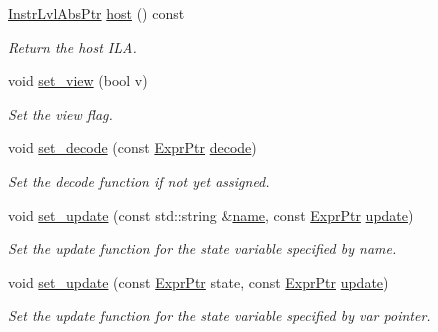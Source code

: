 \begin{DoxyCompactItemize}
\mbox{\label{classilang_1_1_instr_a302d102dcc5e8c47f97f37391d656179}} 
\mbox{\hyperlink{classilang_1_1_instr_ab36b0ed04e0c44e66867ed1d61009f12}{Instr\+Lvl\+Abs\+Ptr}} \mbox{\hyperlink{classilang_1_1_instr_a302d102dcc5e8c47f97f37391d656179}{host}} () const
\begin{DoxyCompactList}\small\item\em Return the host I\+LA. \end{DoxyCompactList}\item 
void \mbox{\hyperlink{classilang_1_1_instr_a797d88453c8368611a2ed36c8edf99a2}{set\+\_\+view}} (bool v)
\begin{DoxyCompactList}\small\item\em Set the view flag. \end{DoxyCompactList}\item 
void \mbox{\hyperlink{classilang_1_1_instr_aab1827c6605186d0f2a71635dea19285}{set\+\_\+decode}} (const \mbox{\hyperlink{namespaceilang_a7c4196c72e53ea4df4b7861af7bc3bce}{Expr\+Ptr}} \mbox{\hyperlink{classilang_1_1_instr_a85ca826871a1ed004189ef24e994cfea}{decode}})
\begin{DoxyCompactList}\small\item\em Set the decode function if not yet assigned. \end{DoxyCompactList}\item 
void \mbox{\hyperlink{classilang_1_1_instr_a248d466e6e2d599da4673b43db28cc02}{set\+\_\+update}} (const std\+::string \&\mbox{\hyperlink{classilang_1_1_object_acf20b072e69f572910d7d80c93af0b38}{name}}, const \mbox{\hyperlink{namespaceilang_a7c4196c72e53ea4df4b7861af7bc3bce}{Expr\+Ptr}} \mbox{\hyperlink{classilang_1_1_instr_a8da933306450bb7807b57e48fc18f1c4}{update}})
\begin{DoxyCompactList}\small\item\em Set the update function for the state variable specified by name. \end{DoxyCompactList}\item 
void \mbox{\hyperlink{classilang_1_1_instr_a18867fe296b2c31a4a762cf236e81e43}{set\+\_\+update}} (const \mbox{\hyperlink{namespaceilang_a7c4196c72e53ea4df4b7861af7bc3bce}{Expr\+Ptr}} state, const \mbox{\hyperlink{namespaceilang_a7c4196c72e53ea4df4b7861af7bc3bce}{Expr\+Ptr}} \mbox{\hyperlink{classilang_1_1_instr_a8da933306450bb7807b57e48fc18f1c4}{update}})
\begin{DoxyCompactList}\small\item\em Set the update function for the state variable specified by var pointer. \end{DoxyCompactList}\item 

\end{DoxyCompactItemize}

